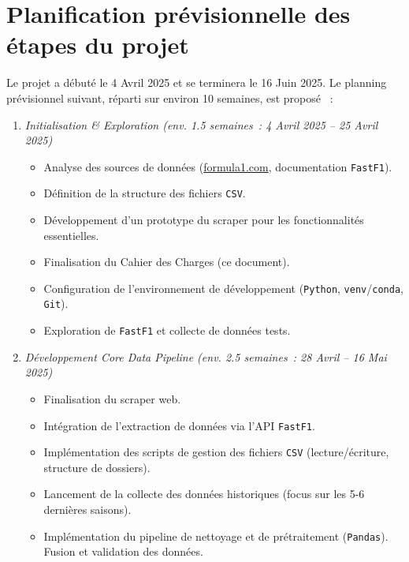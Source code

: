 \documentclass[11pt, a4paper]{article}
\newcommand{\lib}[1]{\texttt{#1}}
\newcommand{\startDate}{4 Avril 2025}
\begin{document}
\newpage

\section{Planification prévisionnelle des étapes du projet}
Le projet a débuté le \startDate{} et se terminera le 16 Juin 2025. Le planning prévisionnel suivant, réparti sur environ 10 semaines, est proposé ~:

\begin{enumerate}[label=Phase \arabic*:, wide, labelwidth=!, labelindent=0pt, leftmargin=*, itemsep=0.5em]
    \item \textit{Initialisation \& Exploration (env. 1.5 semaines~: \startDate{} -- 25 Avril 2025)}
    \begin{itemize}[label=\textendash, itemsep=0.2em, leftmargin=*]
        \item Analyse des sources de données (\url{formula1.com}, documentation \lib{FastF1}).
        \item Définition de la structure des fichiers \lib{CSV}.
        \item Développement d'un prototype du scraper pour les fonctionnalités essentielles.
        \item Finalisation du Cahier des Charges (ce document).
        \item Configuration de l'environnement de développement (\lib{Python}, \lib{venv}/\lib{conda}, \lib{Git}).
        \item Exploration de \lib{FastF1} et collecte de données tests.
    \end{itemize}

    \item \textit{Développement Core Data Pipeline (env. 2.5 semaines~: 28 Avril -- 16 Mai 2025)}
    \begin{itemize}[label=\textendash, itemsep=0.2em, leftmargin=*]
        \item Finalisation du scraper web. 
        \item Intégration de l'extraction de données via l'API \lib{FastF1}.
        \item Implémentation des scripts de gestion des fichiers \lib{CSV} (lecture/écriture, structure de dossiers).
        \item Lancement de la collecte des données historiques (focus sur les 5-6 dernières saisons).
        \item Implémentation du pipeline de nettoyage et de prétraitement (\lib{Pandas}). Fusion et validation des données.
    \end{itemize}


\end{enumerate}
\end{document}
